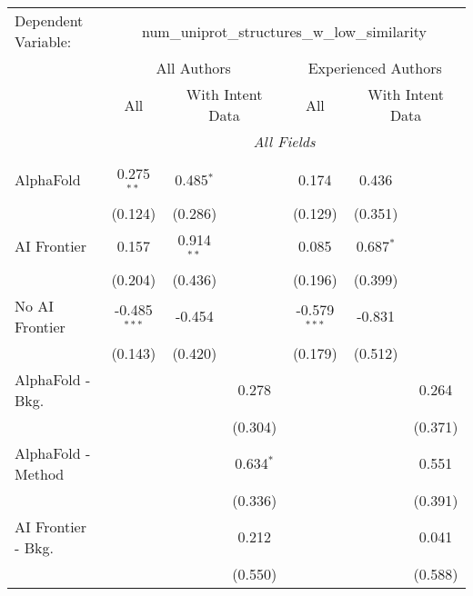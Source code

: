 \begingroup
\centering
\begin{tabular}{lcccccc}
   \tabularnewline \midrule \midrule
   Dependent Variable: & \multicolumn{6}{c}{num\_uniprot\_structures\_w\_low\_similarity}\\
 & \multicolumn{3}{c}{All Authors} & \multicolumn{3}{c}{Experienced Authors} \\
\cmidrule(lr){2-4} \cmidrule(lr){5-7}
 & \multicolumn{1}{c}{All} & \multicolumn{2}{c}{With Intent Data} & \multicolumn{1}{c}{All} & \multicolumn{2}{c}{With Intent Data} \\
\cmidrule(lr){2-2} \cmidrule(lr){3-4} \cmidrule(lr){5-5} \cmidrule(lr){6-7}
 & \multicolumn{6}{c}{\textit{All Fields}} \\ \\
   AlphaFold               & 0.275$^{**}$   & 0.485$^{*}$  &             & 0.174          & 0.436       &   \\   
                           & (0.124)        & (0.286)      &             & (0.129)        & (0.351)     &   \\   
   AI Frontier             & 0.157          & 0.914$^{**}$ &             & 0.085          & 0.687$^{*}$ &   \\   
                           & (0.204)        & (0.436)      &             & (0.196)        & (0.399)     &   \\   
   No AI Frontier          & -0.485$^{***}$ & -0.454       &             & -0.579$^{***}$ & -0.831      &   \\   
                           & (0.143)        & (0.420)      &             & (0.179)        & (0.512)     &   \\   
   AlphaFold - Bkg.        &                &              & 0.278       &                &             & 0.264\\   
                           &                &              & (0.304)     &                &             & (0.371)\\   
   AlphaFold - Method      &                &              & 0.634$^{*}$ &                &             & 0.551\\   
                           &                &              & (0.336)     &                &             & (0.391)\\   
   AI Frontier - Bkg.      &                &              & 0.212       &                &             & 0.041\\   
                           &                &              & (0.550)     &                &             & (0.588)\\   

\end{tabular}
